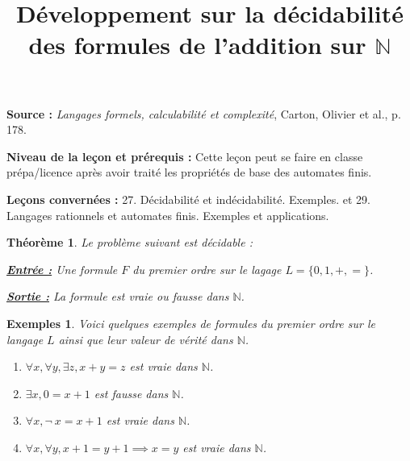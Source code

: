 \documentclass[12pt]{article}
\title{Développement sur la décidabilité des formules de l'addition sur $\mathbb{N}$}
\theoremstyle{break}
\newtheorem*{theorem*}{Théorème}
\newtheorem*{examples*}{Exemples}
\begin{document}
\maketitle

\noindent
\textbf{Source :} \textit{Langages formels, calculabilité et complexité}, Carton, Olivier et al., p. 178.

\noindent
\textbf{Niveau de la leçon et prérequis :} Cette leçon peut se faire en classe prépa/licence après avoir traité les propriétés de base des automates finis.

\noindent
\textbf{Leçons convernées :} 27. Décidabilité et indécidabilité. Exemples. et 29. Langages rationnels et automates finis. Exemples et applications.

\begin{theorem*}
  Le problème suivant est décidable :

  \underline{\textbf{Entrée :}} Une formule $F$ du premier ordre sur le lagage $L=\{0, 1, +, =\}$.

  \underline{\textbf{Sortie :}} La formule est vraie ou fausse dans $\mathbb{N}$.
\end{theorem*}

\begin{examples*}
  Voici quelques exemples de formules du premier ordre sur le langage $L$ ainsi que leur valeur de vérité dans $\mathbb{N}$.
  \begin{enumerate}    
  \item $\forall x, \forall y, \exists z, x + y = z$ est vraie dans $\mathbb{N}$.
  \item $\exists x, 0 = x + 1$ est fausse dans $\mathbb{N}$.
  \item $\forall x, \lnot\ x = x + 1$ est vraie dans $\mathbb{N}$.
  \item $\forall x, \forall y, x + 1 = y + 1 \implies x = y$ est vraie dans $\mathbb{N}$.
  \end{enumerate}
\end{examples*}
\end{document}
